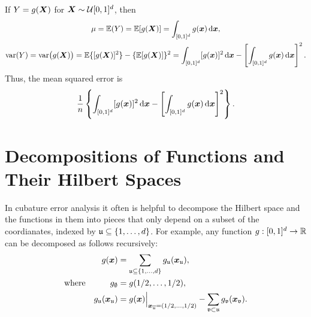 \documentclass[letterpaper]{amsart}
\newcommand{\fv}{\mathfrak{v}}
\begin{document}
If $Y = g(\boldsymbol{X})$ for $\boldsymbol{X} \sim \mathcal{U}[0,1]^d$, then
\begin{gather*}
    \mu = \operatorname{\mathbb{E}}(Y) = \operatorname{\mathbb{E}}[g(\boldsymbol{X})]  = \int_{[0,1]^d} g(\boldsymbol{x}) \, {\rm d} \boldsymbol{x}, \\
    \operatorname{var}(Y) = \operatorname{var}\bigl(g(\boldsymbol{X})\bigr) = \operatorname{\mathbb{E}}\{[g(\boldsymbol{X})]^2\} - \{\operatorname{\mathbb{E}}[g(\boldsymbol{X})]\}^2 = \int_{[0,1]^d} [g(\boldsymbol{x})]^2  \, {\rm d} \boldsymbol{x} -
    \left[\int_{[0,1]^d} g(\boldsymbol{x}) \, {\rm d} \boldsymbol{x}\right]^2.
\end{gather*}
Thus, the mean squared error is
\[
\frac 1n  \left\{\int_{[0,1]^d} [g(\boldsymbol{x})]^2  \, {\rm d} \boldsymbol{x} -
    \left[\int_{[0,1]^d} g(\boldsymbol{x}) \, {\rm d} \boldsymbol{x}\right]^2 \right\}.
\]

\section{Decompositions of Functions and Their Hilbert Spaces} \label{sec:decomp}
In cubature error analysis it often is helpful to decompose the Hilbert space and the functions in them into pieces that only depend on a subset of the coordianates, indexed by $\mathfrak{u} \subseteq \{1, \ldots, d\}$.  For example, any function $g:[0,1]^d \to \mathbb{R}$ can be decomposed as follows recursively:
\begin{align*}
	&& g(\vx) & = \sum_{\fu \subseteq \{1, \ldots, d\}} g_\fu(\vx_\fu), \\
	&\text{where}& g_\emptyset &= g(1/2, \ldots, 1/2), \\
	&&g_{\fu}(\vx_\fu) &= g(\vx) \Bigr |_{\vx_{\overline{\fu}} = (1/2, \ldots, 1/2)} - \sum_{\fv \subset \fu} g_{\fv}(\vx_\fv).
\end{align*}
\end{document}
